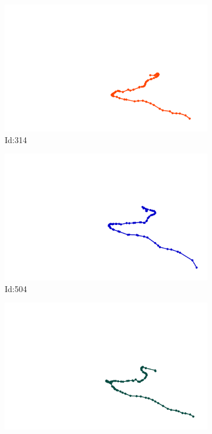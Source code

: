 \documentclass[12pt,twoside]{report}
\begin{document}
\begin{figure}
\centering
\begin{subfigure}[b]{0.20\textwidth}
\centering
\includegraphics[width=\textwidth]{../../trajectories/314.png}
\caption{Id:314}
\end{subfigure}
\begin{subfigure}[b]{0.20\textwidth}
\centering
\includegraphics[width=\textwidth]{../../trajectories/504.png}
\caption{Id:504}
\end{subfigure}
\begin{subfigure}[b]{0.20\textwidth}
\centering
\includegraphics[width=\textwidth]{../../trajectories/524.png}

\end{subfigure}
\end{figure}
\end{document}
